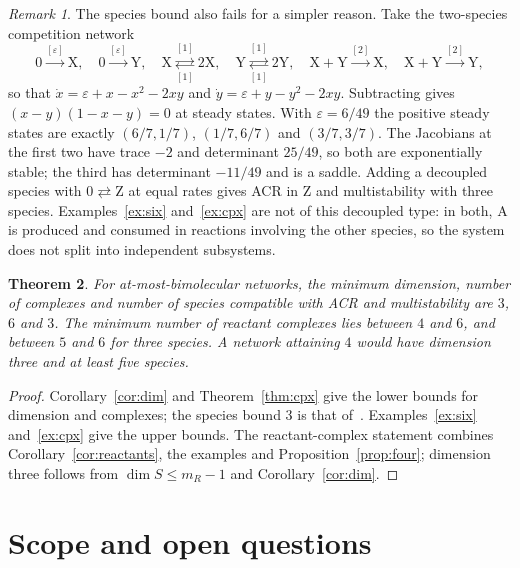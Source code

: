 \documentclass[11pt]{amsart}
\newtheorem{theorem}{Theorem}[section]
\theoremstyle{definition}
\theoremstyle{remark}
\newtheorem{remark}[theorem]{Remark}
\newcommand{\ce}[1]{\mathrm{#1}}
\begin{document}
\begin{remark}\label{rem:union}
The species bound also fails for a simpler reason. Take the two-species competition network
\[
 0\xrightarrow{[\varepsilon]}\ce X,\quad 0\xrightarrow{[\varepsilon]}\ce Y,\quad \ce X\overset{[1]}{\underset{[1]}{\rightleftarrows}}2\ce X,\quad \ce Y\overset{[1]}{\underset{[1]}{\rightleftarrows}}2\ce Y,\quad \ce X+\ce Y\xrightarrow{[2]}\ce X,\quad \ce X+\ce Y\xrightarrow{[2]}\ce Y,
\]
so that $\dot x=\varepsilon+x-x^2-2xy$ and $\dot y=\varepsilon+y-y^2-2xy$. Subtracting gives $(x-y)(1-x-y)=0$ at steady states. With $\varepsilon=6/49$ the positive steady states are exactly $(6/7,1/7)$, $(1/7,6/7)$ and $(3/7,3/7)$. The Jacobians at the first two have trace $-2$ and determinant $25/49$, so both are exponentially stable; the third has determinant $-11/49$ and is a saddle. Adding a decoupled species with $0\rightleftarrows\ce Z$ at equal rates gives ACR in $\ce Z$ and multistability with three species. Examples~\ref{ex:six} and~\ref{ex:cpx} are not of this decoupled type: in both, $\ce A$ is produced and consumed in reactions involving the other species, so the system does not split into independent subsystems.
\end{remark}

\begin{theorem}\label{thm:minima}
For at-most-bimolecular networks, the minimum dimension, number of complexes and number of species compatible with ACR and multistability are $3$, $6$ and $3$. The minimum number of reactant complexes lies between $4$ and $6$, and between $5$ and $6$ for three species. A network attaining $4$ would have dimension three and at least five species.
\end{theorem}

\begin{proof}
Corollary~\ref{cor:dim} and Theorem~\ref{thm:cpx} give the lower bounds for dimension and complexes; the species bound $3$ is that of~\cite{kns2024}. Examples~\ref{ex:six} and~\ref{ex:cpx} give the upper bounds. The reactant-complex statement combines Corollary~\ref{cor:reactants}, the examples and Proposition~\ref{prop:four}; dimension three follows from $\dim S\le m_R-1$ and Corollary~\ref{cor:dim}.
\end{proof}

\section{Scope and open questions}
\end{document}
